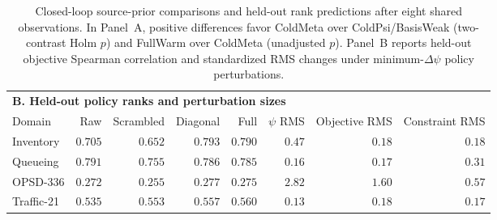 \begin{table}[htbp]\centering\scriptsize
\caption{Closed-loop source-prior comparisons and held-out rank predictions after eight shared observations. In Panel~A, positive differences favor ColdMeta over ColdPsi/BasisWeak (two-contrast Holm $p$) and FullWarm over ColdMeta (unadjusted $p$). Panel~B reports held-out objective Spearman correlation and standardized RMS changes under minimum-$\Delta\psi$ policy perturbations.}\label{tab:metaprior_decomp}
\par\smallskip
\begin{tabular}{lrrrrrrr}\toprule
\multicolumn{8}{l}{\textbf{B. Held-out policy ranks and perturbation sizes}} \\
Domain & Raw & Scrambled & Diagonal & Full & $\psi$ RMS & Objective RMS & Constraint RMS \\
\midrule
Inventory & $0.705$ & $0.652$ & $0.793$ & $0.790$ & $0.47$ & $0.18$ & $0.18$ \\
Queueing & $0.791$ & $0.755$ & $0.786$ & $0.785$ & $0.16$ & $0.17$ & $0.31$ \\
OPSD-336 & $0.272$ & $0.255$ & $0.277$ & $0.275$ & $2.82$ & $1.60$ & $0.57$ \\
Traffic-21 & $0.535$ & $0.553$ & $0.557$ & $0.560$ & $0.13$ & $0.18$ & $0.17$ \\
\bottomrule\end{tabular}\end{table}
